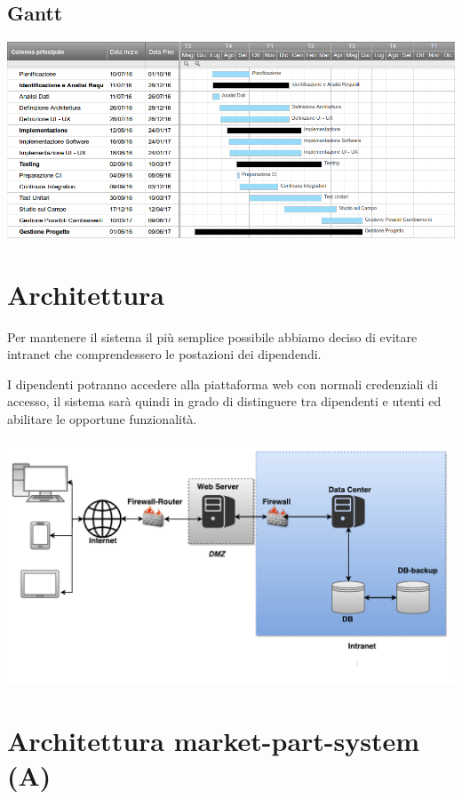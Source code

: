 \documentclass[11pt]{article} %
\begin{document}
\begin{landscape}

\section{Gantt}

\includegraphics[scale=0.6]{Gantt}

\end{landscape}

\section{Architettura}

Per mantenere il sistema il più semplice possibile abbiamo deciso di evitare intranet che comprendessero le postazioni dei dipendendi.

I dipendenti potranno accedere alla piattaforma web con normali credenziali di accesso, il sistema sarà quindi in grado di distinguere tra dipendenti e utenti ed abilitare le opportune funzionalità.

\vspace{0.35in}
\hspace{-1.5in}
\includegraphics[scale=0.9]{Architettura1}

\section{Architettura market-part-system (A)}






\end{document}
